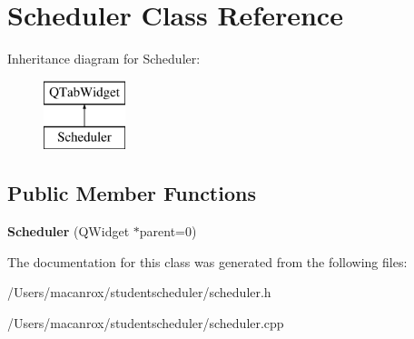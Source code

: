 \hypertarget{class_scheduler}{\section{Scheduler Class Reference}
\label{class_scheduler}
}
Inheritance diagram for Scheduler\-:\begin{figure}[H]
\begin{center}
\leavevmode
\includegraphics[height=2.000000cm]{class_scheduler}
\end{center}
\end{figure}
\subsection*{Public Member Functions}
\begin{DoxyCompactItemize}
\item 
\hypertarget{class_scheduler_a0343ae3b4e0bfad59da1f45abf2ac5e9}{{\bfseries Scheduler} (Q\-Widget $\ast$parent=0)}\label{class_scheduler_a0343ae3b4e0bfad59da1f45abf2ac5e9}

\end{DoxyCompactItemize}


The documentation for this class was generated from the following files\-:\begin{DoxyCompactItemize}
\item 
/\-Users/macanrox/studentscheduler/scheduler.\-h\item 
/\-Users/macanrox/studentscheduler/scheduler.\-cpp\end{DoxyCompactItemize}
